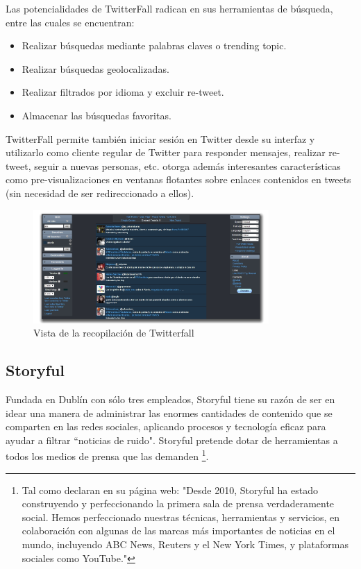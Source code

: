 Las potencialidades de TwitterFall radican en sus herramientas de búsqueda, entre las cuales se encuentran:
\begin{itemize}
	\item Realizar búsquedas mediante palabras claves o trending topic.
	\item Realizar búsquedas geolocalizadas.
	\item Realizar filtrados por idioma y excluir re-tweet.
	\item Almacenar las búsquedas favoritas.
\end{itemize}

TwitterFall permite también iniciar sesión en Twitter desde su interfaz y utilizarlo como cliente regular de Twitter para responder mensajes, realizar re-tweet, seguir a nuevas personas, etc. otorga además interesantes características como pre-visualizaciones en ventanas flotantes sobre enlaces contenidos en tweets (sin necesidad de ser redireccionado a ellos).



\begin{figure}[H]
	\centering
	\includegraphics[width=0.8\textwidth]{imgs/twitterfall.jpg}
	\caption{Vista de la recopilación de Twitterfall}
	\label{fig:twitterfall}
\end{figure}

\subsection{Storyful}

Fundada en Dublín con sólo tres empleados, Storyful \cite{storyful} tiene su razón de ser en idear una manera de administrar las enormes cantidades de contenido que se comparten en las redes sociales, aplicando procesos y tecnología eficaz para ayudar a filtrar ``noticias de ruido". Storyful pretende dotar de herramientas a todos los medios de prensa que las demanden \footnote{ Tal como declaran en su página web: "Desde 2010, Storyful ha estado construyendo y perfeccionando la primera sala de prensa verdaderamente social. Hemos perfeccionado nuestras técnicas, herramientas y servicios, en colaboración con algunas de las marcas más importantes de noticias en el mundo, incluyendo ABC News, Reuters y el New York Times, y plataformas sociales como YouTube." }.

